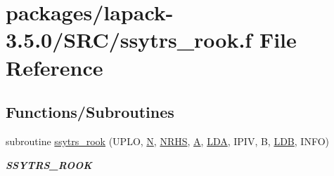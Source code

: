 \hypertarget{ssytrs__rook_8f}{}\section{packages/lapack-\/3.5.0/\+S\+R\+C/ssytrs\+\_\+rook.f File Reference}
\label{ssytrs__rook_8f}
\subsection*{Functions/\+Subroutines}
\begin{DoxyCompactItemize}
\item 
subroutine \hyperlink{group__realSYcomputational_ga919d6dd600fb34f939eb34e18751d702}{ssytrs\+\_\+rook} (U\+P\+L\+O, \hyperlink{polmisc_8c_a0240ac851181b84ac374872dc5434ee4}{N}, \hyperlink{example__user_8c_aa0138da002ce2a90360df2f521eb3198}{N\+R\+H\+S}, \hyperlink{classA}{A}, \hyperlink{example__user_8c_ae946da542ce0db94dced19b2ecefd1aa}{L\+D\+A}, I\+P\+I\+V, B, \hyperlink{example__user_8c_a50e90a7104df172b5a89a06c47fcca04}{L\+D\+B}, I\+N\+F\+O)
\begin{DoxyCompactList}\small\item\em {\bfseries S\+S\+Y\+T\+R\+S\+\_\+\+R\+O\+O\+K} \end{DoxyCompactList}\end{DoxyCompactItemize}
